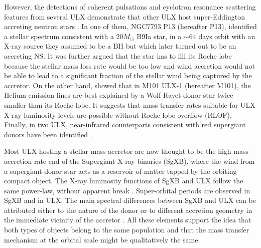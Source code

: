 \documentclass[letter]{aa}
\makeatletter
\newcommand{\sgx}{SgXB\xspace}
\newcommand{\ulx}{ULX\xspace}
\newcommand*{\rlof}{RLOF\@\xspace}
\newcommand*{\ns}{NS\@\xspace}
\newcommand*{\bh}{BH\@\xspace}
\newcommand*{\msun}{$M_{\odot}$\@\xspace}
\makeatother
\begin{document}
However, the detections of coherent pulsations and cyclotron resonance scattering features from several ULX demonstrate that other ULX host super-Eddington accreting neutron stars \citep[\ns,][]{Bachetti2014,Furst2016,Israel2017,Carpano2018,Brightman2018}. In one of them, NGC7793 P13 (hereafter P13), \cite{Motch2014} identified a stellar spectrum consistent with a 20\msun B9Ia star, in a $\sim$64 days orbit with an X-ray source they assumed to be a \bh but which later turned out to be an accreting \ns \citep{Furst2016}. It was further argued that the star has to fill its Roche lobe because the stellar mass loss rate would be too low and wind accretion would not be able to lead to a significant fraction of the stellar wind being captured by the accretor. On the other hand, \cite{Liu2013} showed that in M101 ULX-1 (hereafter M101), the Helium emission lines are best explained by a Wolf-Rayet donor star twice smaller than its Roche lobe. It suggests that mass transfer rates suitable for \ulx X-ray luminosity levels are possible without Roche lobe overflow (\rlof). Finally, in two ULX, near-infrared counterparts consistent with red supergiant donors have been identified \citep{Heida2015,Heida2016}.

Most ULX hosting a stellar mass accretor are now thought to be the high mass accretion rate end of the Supergiant X-ray binaries (\sgx), where the wind from a supergiant donor star acts as a reservoir of matter tapped by the orbiting compact object. The X-ray luminosity functions of \sgx and \ulx follow the same power-law, without apparent break \citep{Gilfanov2004,Swartz2011}. Super-orbital periods are observed in \sgx \citep{Corbet2013} and in \ulx \citep{Walton2016,Fuerst2018}. The main spectral differences between \sgx and \ulx can be attributed either to the nature of the donor or to different accretion geometry in the immediate vicinity of the accretor \citep{Kaaret2017}. All these elements support the idea that both types of objects belong to the same population and that the mass transfer mechanism at the orbital scale might be qualitatively the same.
\end{document}
